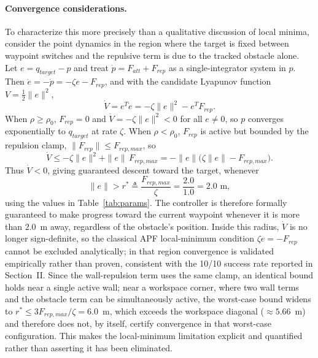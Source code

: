 \documentclass[conference]{IEEEtran}
\begin{document}
\paragraph{Convergence considerations.} To characterize this more precisely than a qualitative discussion of local minima, consider the point dynamics in the region where the target is fixed between waypoint switches and the repulsive term is due to the tracked obstacle alone. Let $e=q_{target}-p$ and treat $\dot p = F_{att}+F_{rep}$ as a single-integrator system in $p$. Then $\dot e = -\dot p = -\zeta e - F_{rep}$, and with the candidate Lyapunov function $V=\tfrac12\|e\|^2$,
\[
\dot V = e^{T}\dot e = -\zeta\|e\|^2 - e^{T}F_{rep}.
\]
When $\rho\ge\rho_0$, $F_{rep}=0$ and $\dot V = -\zeta\|e\|^2<0$ for all $e\neq0$, so $p$ converges exponentially to $q_{target}$ at rate $\zeta$. When $\rho<\rho_0$, $F_{rep}$ is active but bounded by the repulsion clamp, $\|F_{rep}\|\le F_{rep,max}$, so
\[
\dot V \le -\zeta\|e\|^2 + \|e\|\,F_{rep,max} = -\|e\|\big(\zeta\|e\|-F_{rep,max}\big).
\]
Thus $\dot V<0$, giving guaranteed descent toward the target, whenever
\[
\|e\| > r^{*} \triangleq \frac{F_{rep,max}}{\zeta} = \frac{2.0}{1.0} = 2.0\text{~m},
\]
using the values in Table~\ref{tab:params}. The controller is therefore formally guaranteed to make progress toward the current waypoint whenever it is more than $2.0$~m away, regardless of the obstacle's position. Inside this radius, $\dot V$ is no longer sign-definite, so the classical APF local-minimum condition $\zeta e = -F_{rep}$ cannot be excluded analytically; in that region convergence is validated empirically rather than proven, consistent with the 10/10 success rate reported in Section~II. Since the wall-repulsion term uses the same clamp, an identical bound holds near a single active wall; near a workspace corner, where two wall terms and the obstacle term can be simultaneously active, the worst-case bound widens to $r^{*}\le 3F_{rep,max}/\zeta = 6.0$~m, which exceeds the workspace diagonal ($\approx5.66$~m) and therefore does not, by itself, certify convergence in that worst-case configuration. This makes the local-minimum limitation explicit and quantified rather than asserting it has been eliminated.
\end{document}
